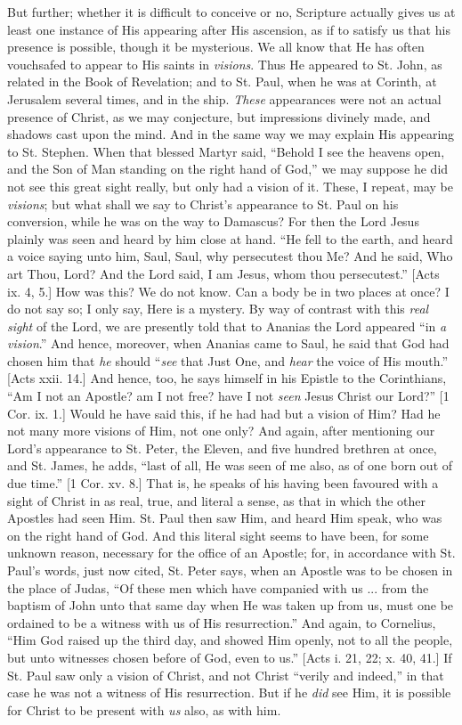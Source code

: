 But further; whether it is difficult to conceive or no, Scripture
actually gives us at least one instance of His appearing after His
ascension, as if to satisfy us that his presence is possible, though it
be mysterious. We all know that He has often vouchsafed to appear to His
saints in \emph{visions}. Thus He appeared to St. John, as related in
the Book of Revelation; and to St. Paul, when he was at Corinth, at
Jerusalem several times, and in the ship. \emph{These} appearances were
not an actual presence of Christ, as we may conjecture, but impressions
divinely made, and shadows cast upon the mind. And in the same way we
may explain His appearing to St. Stephen. When that blessed Martyr said,
``Behold I see the heavens open, and the Son of Man standing on the
right hand of God,'' we may suppose he did not see this great sight
really, but only had a vision of it. These, I repeat, may be \emph{visions};
but what shall we say to Christ's appearance to St. Paul on his
conversion, while he was on the way to Damascus? For then the Lord Jesus
plainly was seen and heard by him close at hand. ``He fell to the
earth, and heard a voice saying unto him, Saul, Saul, why persecutest
thou Me? And he said, Who art Thou, Lord? And the Lord said, I am Jesus,
whom thou persecutest.'' [Acts ix. 4, 5.] How was this? We do not
know. Can a body be in two places at once? I do not say so; I only say,
Here is a mystery. By way of contrast with this \emph{real sight} of the
Lord, we are presently told that to Ananias the Lord appeared ``in \emph{a
vision}.'' And hence, moreover, when Ananias came to Saul, he
said that God had chosen him that \emph{he} should ``\emph{see} that
Just One, and \emph{hear} the voice of His mouth.'' [Acts xxii. 14.]
And hence, too, he says himself in his Epistle to the Corinthians,
``Am I not an Apostle? am I not free? have I not \emph{seen} Jesus
Christ our Lord?'' [1 Cor. ix. 1.] Would he have said this, if he
had had but a vision of Him? Had he not many more visions of Him, not
one only? And again, after mentioning our Lord's appearance to St.
Peter, the Eleven, and five hundred brethren at once, and St. James, he
adds, ``last of all, He was seen of me also, as of one born out of
due time.'' [1 Cor. xv. 8.] That is, he speaks of his having been
favoured with a sight of Christ in as real, true, and literal a sense,
as that in which the other Apostles had seen Him. St. Paul then saw Him,
and heard Him speak, who was on the right hand of God. And this literal
sight seems to have been, for some unknown reason, necessary for the
office of an Apostle; for, in accordance with St. Paul's words, just now
cited, St. Peter says, when an Apostle was to be chosen in the place of
Judas, ``Of these men which have companied with us ... from the
baptism of John unto that same day when He was taken up from us, must
one be ordained to be a witness with us of His resurrection.'' And
again, to Cornelius, ``Him God raised up the third day, and showed
Him openly, not to all the people, but unto witnesses chosen before of
God, even to us.'' [Acts i. 21, 22; x. 40, 41.] If St. Paul saw only
a vision of Christ, and not Christ ``verily and indeed,'' in
that case he was not a witness of His resurrection. But if he \emph{did}
see Him, it is possible for Christ to be present with \emph{us} also, as with
him.

